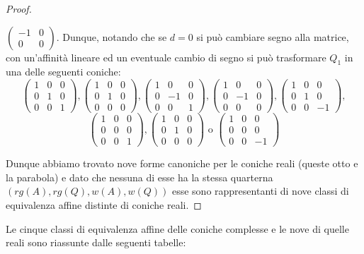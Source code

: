 \begin{proof}
\begin{description}
 $\left(\begin{smallmatrix} -1 & 0 \\ 0 & 0 \end{smallmatrix}\right)$. Dunque, notando che se $d=0$ si può cambiare segno alla matrice, con
 un'affinità lineare ed un eventuale cambio di segno si può trasformare $Q_1$ in una delle seguenti coniche:
 $$\left( \begin{array}{ccc}
   1 & 0 & 0\\
   0 & 1 & 0\\
   0 & 0 & 1
  \end{array} \right) ,
  \left( \begin{array}{ccc}
   1 & 0 & 0\\
   0 & 1 & 0\\
   0 & 0 & 0
  \end{array} \right) ,
  \left( \begin{array}{ccc}
   1 & 0 & 0\\
   0 & -1 & 0\\
   0 & 0 & 1
  \end{array} \right) ,
  \left( \begin{array}{ccc}
   1 & 0 & 0\\
   0 & -1 & 0\\
   0 & 0 & 0
  \end{array} \right) ,
  \left( \begin{array}{ccc}
   1 & 0 & 0\\
   0 & 1 & 0\\
   0 & 0 & -1
  \end{array} \right) ,$$
  $$\left( \begin{array}{ccc}
   1 & 0 & 0\\
   0 & 0 & 0\\
   0 & 0 & 1
  \end{array} \right) ,
  \left( \begin{array}{ccc}
   1 & 0 & 0\\
   0 & 1 & 0\\
   0 & 0 & 0
  \end{array} \right) \text{ o }
  \left( \begin{array}{ccc}
   1 & 0 & 0\\
   0 & 0 & 0\\
   0 & 0 & -1
  \end{array} \right)$$
 \end{description}
 Dunque abbiamo trovato nove forme canoniche per le coniche reali (queste otto e la parabola) e dato che nessuna di esse ha la stessa quarterna
 $(rg(A),rg(Q),w(A),w(Q))$ esse sono rappresentanti di nove classi di equivalenza affine distinte di coniche reali.
\end{proof}
 Le cinque classi di equivalenza affine delle coniche complesse e le nove di quelle reali sono riassunte dalle seguenti tabelle:
 
